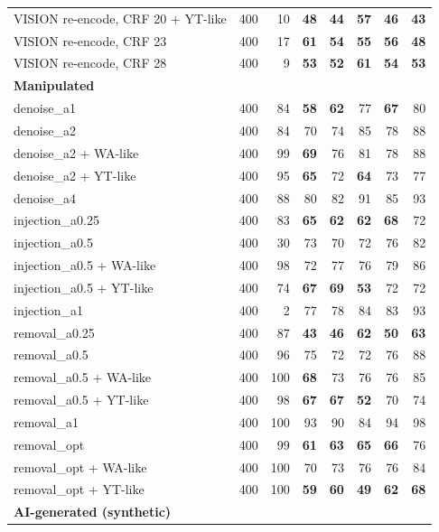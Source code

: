 \documentclass[11pt,a4paper]{article}
\begin{document}
{\begin{longtable}{p{7.0cm}rrrrrrr}
VISION re-encode, CRF 20 + YT-like & 400 & 10 & \textbf{48} & \textbf{44} & \textbf{57} & \textbf{46} & \textbf{43} \\
VISION re-encode, CRF 23 & 400 & 17 & \textbf{61} & \textbf{54} & \textbf{55} & \textbf{56} & \textbf{48} \\
VISION re-encode, CRF 28 & 400 & 9 & \textbf{53} & \textbf{52} & \textbf{61} & \textbf{54} & \textbf{53} \\
\midrule\multicolumn{8}{l}{\textbf{Manipulated}} \\
denoise\_a1 & 400 & 84 & \textbf{58} & \textbf{62} & 77 & \textbf{67} & 80 \\
denoise\_a2 & 400 & 84 & 70 & 74 & 85 & 78 & 88 \\
denoise\_a2 + WA-like & 400 & 99 & \textbf{69} & 76 & 81 & 78 & 88 \\
denoise\_a2 + YT-like & 400 & 95 & \textbf{65} & 72 & \textbf{64} & 73 & 77 \\
denoise\_a4 & 400 & 88 & 80 & 82 & 91 & 85 & 93 \\
injection\_a0.25 & 400 & 83 & \textbf{65} & \textbf{62} & \textbf{62} & \textbf{68} & 72 \\
injection\_a0.5 & 400 & 30 & 73 & 70 & 72 & 76 & 82 \\
injection\_a0.5 + WA-like & 400 & 98 & 72 & 77 & 76 & 79 & 86 \\
injection\_a0.5 + YT-like & 400 & 74 & \textbf{67} & \textbf{69} & \textbf{53} & 72 & 72 \\
injection\_a1 & 400 & 2 & 77 & 78 & 84 & 83 & 93 \\
removal\_a0.25 & 400 & 87 & \textbf{43} & \textbf{46} & \textbf{62} & \textbf{50} & \textbf{63} \\
removal\_a0.5 & 400 & 96 & 75 & 72 & 72 & 76 & 88 \\
removal\_a0.5 + WA-like & 400 & 100 & \textbf{68} & 73 & 76 & 76 & 85 \\
removal\_a0.5 + YT-like & 400 & 98 & \textbf{67} & \textbf{67} & \textbf{52} & 70 & 74 \\
removal\_a1 & 400 & 100 & 93 & 90 & 84 & 94 & 98 \\
removal\_opt & 400 & 99 & \textbf{61} & \textbf{63} & \textbf{65} & \textbf{66} & 76 \\
removal\_opt + WA-like & 400 & 100 & 70 & 73 & 76 & 76 & 84 \\
removal\_opt + YT-like & 400 & 100 & \textbf{59} & \textbf{60} & \textbf{49} & \textbf{62} & \textbf{68} \\
\midrule\multicolumn{8}{l}{\textbf{AI-generated (synthetic)}} \\

\end{longtable}}
\end{document}
